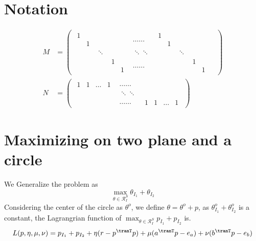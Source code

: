 \section{Notation}
\begin{align}
M &= 
\begin{pmatrix}
\begin{matrix} 1&\\&1 \end{matrix}& & &\dots\dots&\begin{matrix} 1&\\&1 \end{matrix}& &  \\
&\ddots& & \ddots\ddots & & \ddots & & \\
& &\begin{matrix} 1&\\&1 \end{matrix}& \dots\dots& & &\begin{matrix} 1&\\&1 \end{matrix}
\end{pmatrix}\\
N &= 
\begin{pmatrix}
\begin{matrix} 1&1&\dots&1\end{matrix} &\dots\dots \\
&\ddots\ddots&\\
&\dots\dots & \begin{matrix} 1&1&\dots&1\end{matrix}
\end{pmatrix}
\end{align}



\section{Maximizing on two plane and a circle}
We Generalize the problem as 
\begin{equation}
\max_{\theta \in \mathcal{R}^{S}_{I}}{ \theta_{I_1} +\theta_{I_2} }
\end{equation}
Considering the center of the circle as $\theta^o$, we define $\theta = \theta^{o} + p$, as ${ \theta^{o}_{I_1} +\theta^{o}_{I_2} }$ is a constant, the Lagrangrian function of  $\max_{\theta \in \mathcal{R}^{S}_{I}}{ p_{I_1} +p_{I_2} }$ is.
\begin{equation}
L(p,\eta,\mu,\nu) = p_{I_1} +p_{I_2}  + \eta(r - p^{\tranT}p )+\mu( a^{\tranT}p - e_a ) + \nu( b^{\tranT}p - e_b )
\end{equation}

